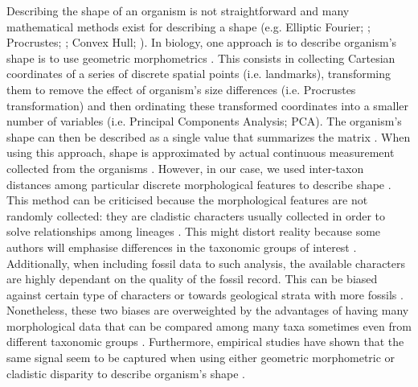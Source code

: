 Describing the shape of an organism is not straightforward and many mathematical methods exist for describing a shape (e.g. Elliptic Fourier; \citealt{Fourier1982}; Procrustes; \citealt{JamesRohlf1993129}; Convex Hull; \citealt{ANDREW1979216}).
In biology, one approach is to describe organism's shape is to use geometric morphometrics \citep{zelditch2012geometric}.
This consists in collecting Cartesian coordinates of a series of discrete spatial points (i.e. landmarks), transforming them to remove the effect of organism's size differences (i.e. Procrustes transformation) and then ordinating these transformed coordinates into a smaller number of variables (i.e. Principal Components Analysis; PCA).
The organism's shape can then be described as a single value that summarizes the matrix \citep[e.g. the sum of the ranges of each PCA axis][]{zelditch2012geometric}.
When using this approach, shape is approximated by actual continuous measurement collected from the organisms \citep[e.g.][]{friedmanexplosive2010,hopkinsdecoupling2013,finlay2015morphological}.
However, in our case, we used inter-taxon distances among particular discrete morphological features to describe shape \citep[i.e. the cladistic disparity method; e.g.][]{foote1997evolution,Wills2001,Wesley-Hunt2005}.
This method can be criticised because the morphological features are not randomly collected: they are cladistic characters usually collected in order to solve relationships among lineages \citep{O'Leary08022013}.
This might distort reality because some authors will emphasise differences in the taxonomic groups of interest \citep{Hopkins24032015}.
Additionally, when including fossil data to such analysis, the available characters are highly dependant on the quality of the fossil record.
This can be biased against certain type of characters \citep[e.g. soft tissue ones;][]{sansomfossilization2013} or towards geological strata with more fossils \citep[e.g. \textit{Lagerst\"{a}tten};][]{Butler2012}.
Nonetheless, these two biases are overweighted by the advantages of having many morphological data \citep[some morphological matrices have more than 1000 morphological characters; e.g.][]{O'Leary08022013,ni2013oldest} that can be compared among many taxa sometimes even from different taxonomic groups \citep[e.g. among all mammals;][]{O'Leary08022013,Slater2012MEE,beckancient2014}.
Furthermore, empirical studies have shown that the same signal seem to be captured when using either geometric morphometric or cladistic disparity to describe organism's shape \citep{foth2012different,hetherington2015cladistic}. 

